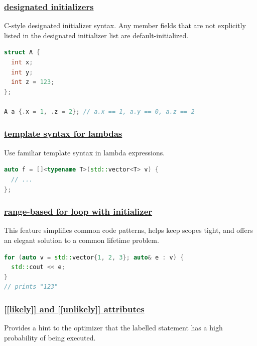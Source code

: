 \subsubsection{\href{https://github.com/AnthonyCalandra/modern-cpp-features/tree/master\#designated-initializers}
                    {designated initializers}}
C-style designated initializer syntax. Any member fields that are not explicitly listed in the designated initializer list are default-initialized.

\begin{lstlisting}[language=C++]
struct A {
  int x;
  int y;
  int z = 123;
};

A a {.x = 1, .z = 2}; // a.x == 1, a.y == 0, a.z == 2
\end{lstlisting}

\subsubsection{\href{https://github.com/AnthonyCalandra/modern-cpp-features/tree/master\#template-syntax-for-lambdas}
                    {template syntax for lambdas}}
Use familiar template syntax in lambda expressions.

\begin{lstlisting}[language=C++]
auto f = []<typename T>(std::vector<T> v) {
  // ...
};
\end{lstlisting}

\subsubsection{\href{https://github.com/AnthonyCalandra/modern-cpp-features/tree/master\#range-based-for-loop-with-initializer}
                    {range-based for loop with initializer}}
This feature simplifies common code patterns, helps keep scopes tight, and offers an elegant solution to a common lifetime problem.

\begin{lstlisting}[language=C++]
for (auto v = std::vector{1, 2, 3}; auto& e : v) {
  std::cout << e;
}
// prints "123"
\end{lstlisting}

\subsubsection{\href{https://github.com/AnthonyCalandra/modern-cpp-features/tree/master\#likely-and-unlikely-attributes}
                    {[[likely]] and [[unlikely]] attributes}}
Provides a hint to the optimizer that the labelled statement has a high probability of being executed.

